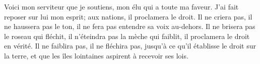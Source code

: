 Voici mon serviteur que je soutiens,
	mon élu qui a toute ma faveur.
J’ai fait reposer sur lui mon esprit;
	aux nations, il proclamera le droit.
Il ne criera pas, il ne haussera pas le ton,
	il ne fera pas entendre sa voix au-dehors.
Il ne brisera pas le roseau qui fléchit,
	il n’éteindra pas la mèche qui faiblit,
	il proclamera le droit en vérité.
Il ne faiblira pas, il ne fléchira pas,
	jusqu’à ce qu’il établisse le droit sur la terre,
	et que les îles lointaines aspirent à recevoir ses lois.
